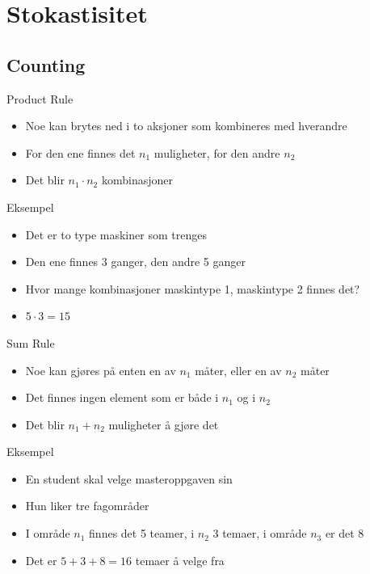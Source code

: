 \section{Stokastisitet}
\subsection{Counting}
\begin{frame}
\begin{block}{Product Rule}
\begin{itemize}
\item Noe kan brytes ned i to aksjoner som kombineres med hverandre
\item For den ene finnes det $n_1$ muligheter, for den andre $n_2$
\item Det blir $n_1\cdot n_2$ kombinasjoner
\end{itemize}
\end{block}
\begin{block}{Eksempel}
\begin{itemize}
\item Det er to type maskiner som trenges
\item Den ene finnes 3 ganger, den andre 5 ganger
\item Hvor mange kombinasjoner maskintype 1, maskintype 2 finnes det?
\item $5\cdot 3=15$
\end{itemize}
\end{block}
\end{frame}

\begin{frame}
\begin{block}{Sum Rule}
\begin{itemize}
\item Noe kan gjøres på enten en av $n_1$ måter, eller en av $n_2$ måter
\item Det finnes ingen element som er både i $n_1$ og i $n_2$
\item Det blir $n_1+n_2$ muligheter å gjøre det
\end{itemize}
\end{block}
\begin{block}{Eksempel}
\begin{itemize}
\item En student skal velge masteroppgaven sin
\item Hun liker tre fagområder
\item I område $n_1$ finnes det 5 teamer, i $n_2$ 3 temaer, i område $n_3$ er det 8
\item Det er $5+3+8=16$ temaer å velge fra
\end{itemize}
\end{block}
\end{frame}

